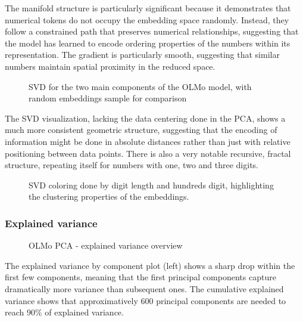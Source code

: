 \documentclass[
  a4paper, twoside, 10pt, titlepage]{book}
\makeatletter
\newcommand*\pandocbounded[1]{%
  \sbox\pandoc@box{#1}%
  \Gscale@div\@tempa{\textheight}{\dimexpr\ht\pandoc@box+\dp\pandoc@box\relax}%
  \Gscale@div\@tempb{\linewidth}{\wd\pandoc@box}%
  \ifdim\@tempb\p@<\@tempa\p@\let\@tempa\@tempb\fi%
  \ifdim\@tempa\p@<\p@\scalebox{\@tempa}{\usebox\pandoc@box}%
  \else\usebox{\pandoc@box}%
  \fi%
}
\makeatother
\begin{document}
The manifold structure is particularly significant because it
demonstrates that numerical tokens do not occupy the embedding space
randomly. Instead, they follow a constrained path that preserves
numerical relationships, suggesting that the model has learned to encode
ordering properties of the numbers within its representation. The
gradient is particularly smooth, suggesting that similar numbers
maintain spatial proximity in the reduced space.

\begin{figure}
\centering
\pandocbounded{}
\caption{SVD for the two main components of the OLMo model, with random
embeddings sample for comparison}\label{fig-olmo-svd}
\end{figure}

The SVD visualization, lacking the data centering done in the PCA, shows
a much more consistent geometric structure, suggesting that the encoding
of information might be done in absolute distances rather than just with
relative positioning between data points. There is also a very notable
recursive, fractal structure, repeating itself for numbers with one, two
and three digits.

\begin{figure}
\centering
\pandocbounded{}
\caption{SVD coloring done by digit length and hundreds digit,
highlighting the clustering properties of the
embeddings.}\label{fig-olmo-svd-digits}
\end{figure}

\subsubsection{Explained variance}\label{explained-variance}

\begin{figure}
\centering
\pandocbounded{}
\caption{OLMo PCA - explained variance
overview}\label{fig-olmo-variance}
\end{figure}

The explained variance by component plot (left) shows a sharp drop
within the first few components, meaning that the first principal
components capture dramatically more variance than subsequent ones. The
cumulative explained variance shows that approximatively 600 principal
components are needed to reach 90\% of explained variance.
\end{document}
